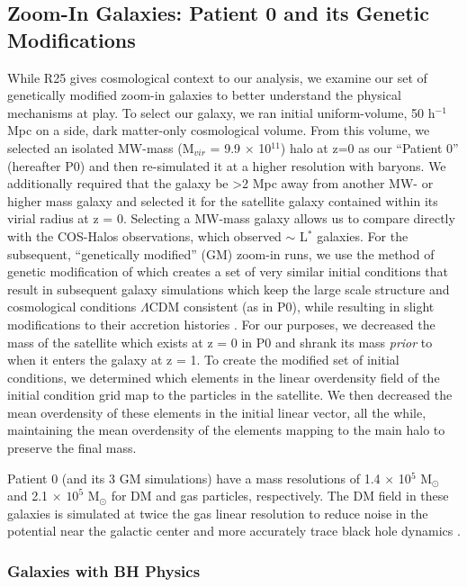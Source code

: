 \documentclass[]{emulateapj}
\begin{document}
\subsection{Zoom-In Galaxies: Patient 0 and its Genetic Modifications}
While R25 gives cosmological context to our analysis, we examine our set of genetically modified zoom-in galaxies to better understand the physical mechanisms at play. To select our galaxy, we ran initial uniform-volume, 50 h$^{-1}$ Mpc on a side, dark matter-only cosmological volume. From this volume, we selected an isolated MW-mass (M$_{vir}$ = 9.9 $\times$ 10$^{11}$) halo at z=0 as our ``Patient 0'' (hereafter P0) and then re-simulated it at a higher resolution with baryons. We additionally required that the galaxy be \textgreater 2 Mpc away from another MW- or higher mass galaxy and selected it for the satellite galaxy contained within its virial radius at z = 0. Selecting a MW-mass galaxy allows us to compare directly with the COS-Halos observations, which observed $\sim$ L$^{*}$ galaxies. For the subsequent, ``genetically modified'' (GM) zoom-in runs, we use the method of genetic modification of \cite{Pontzen2016} which creates a set of very similar initial conditions that result in subsequent galaxy simulations which keep the large scale structure and cosmological conditions $\Lambda$CDM consistent (as in P0), while resulting in slight modifications to their accretion histories \citep{Roth2016}. For our purposes, we decreased the mass of the satellite which exists at z = 0 in P0 and shrank its mass \textit{prior} to when it enters the galaxy at z = 1. To create the modified set of initial conditions, we determined which elements in the linear overdensity field of the initial condition grid map to the particles in the satellite. We then decreased the mean overdensity of these elements in the initial linear vector, all the while, maintaining the mean overdensity of the elements mapping to the main halo to preserve the final mass. 

Patient 0 (and its 3 GM simulations) have a mass resolutions of 1.4 $\times$ 10$^5$ M$_{\odot}$ and 2.1 $\times$ $10^5$ M$_{\odot}$ for DM and gas particles, respectively. The DM field in these galaxies is simulated at twice the gas linear resolution to reduce noise in the potential near the galactic center \citep{Pontzen2016} and more accurately trace black hole dynamics \citep{Tremmel2015}.

\subsubsection{Galaxies with BH Physics} 
\end{document}
